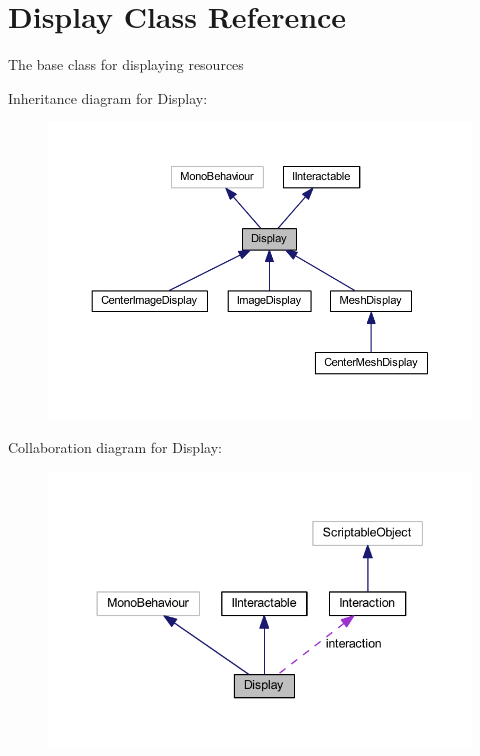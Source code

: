 \hypertarget{class_display}{}\section{Display Class Reference}
\label{class_display}


The base class for displaying resources  




Inheritance diagram for Display\+:
\nopagebreak
\begin{figure}[H]
\begin{center}
\leavevmode
\includegraphics[width=350pt]{class_display__inherit__graph}
\end{center}
\end{figure}


Collaboration diagram for Display\+:
\nopagebreak
\begin{figure}[H]
\begin{center}
\leavevmode
\includegraphics[width=344pt]{class_display__coll__graph}
\end{center}
\end{figure}
